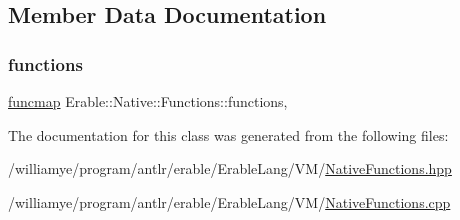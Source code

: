 \subsection{Member Data Documentation}
\mbox{\label{class_erable_1_1_native_1_1_functions_abf72e0b257bbaea52491a7185915596f}} 
\subsubsection{\texorpdfstring{functions}{functions}}
{\footnotesize\ttfamily \mbox{\hyperlink{namespace_erable_1_1_native_a6b24cdc21d4331b17b20ec0d3ed9e851}{funcmap}} Erable\+::\+Native\+::\+Functions\+::functions\hspace{0.3cm}{\ttfamily [inline]}, {\ttfamily [static]}}



The documentation for this class was generated from the following files\+:\begin{DoxyCompactItemize}
\item 
/williamye/program/antlr/erable/\+Erable\+Lang/\+V\+M/\mbox{\hyperlink{_native_functions_8hpp}{Native\+Functions.\+hpp}}\item 
/williamye/program/antlr/erable/\+Erable\+Lang/\+V\+M/\mbox{\hyperlink{_native_functions_8cpp}{Native\+Functions.\+cpp}}\end{DoxyCompactItemize}
